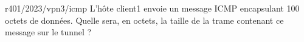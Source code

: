 \begin{question}{r401/2023/vpn3/icmp}
  L'hôte client1 envoie un message ICMP encapsulant 100 octets de
  données. Quelle sera, en octets, la taille de la trame contenant ce
  message sur le tunnel ?
  \begin{reponseshoriz}
  \end{reponseshoriz}
\end{question}
